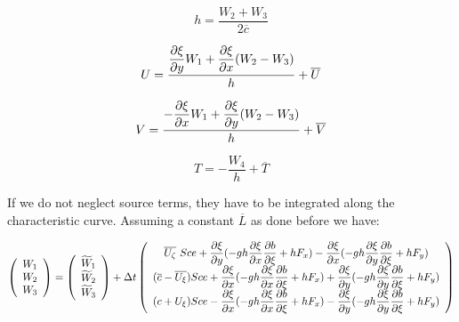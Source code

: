 \begin{equation}
h=\dfrac{W_{2}+W_{3}}{2\overline{c}}
\end{equation}

\begin{equation}
U=\dfrac{\dfrac{\partial \xi }{\partial y}W_{1}+\dfrac{\partial \xi }{%
\partial x}(W_{2}-W_{3})}{h}+\overline{U}
\end{equation}

\begin{equation}
V=\dfrac{-\dfrac{\partial \xi }{\partial x}W_{1}+\dfrac{\partial \xi }{%
\partial y}(W_{2}-W_{3})}{h}+\overline{V}
\end{equation}

\begin{equation}
T=-\dfrac{W_{4}}{h}+\overline{T}
\end{equation}

If we do not neglect source terms, they have to be integrated along the
characteristic curve. Assuming a constant $\overline{L}$ as done before we
have:

\begin{equation}
\left( 
\begin{array}{c}
W_{1} \\ 
W_{2} \\ 
W_{3}%
\end{array}
\right) =\left( 
\begin{array}{c}
\widetilde{W}_{1} \\ 
\widetilde{W}_{2} \\ 
\widetilde{W}_{3}%
\end{array}
\right) +\Delta t\left( 
\begin{array}{c}
\overline{U_{\zeta }}~Sce+\dfrac{\partial \xi }{\partial y}(-gh\dfrac{%
\partial \xi }{\partial x}\dfrac{\partial b}{\partial \xi }+hF_{x})-%
\dfrac{\partial \xi }{\partial x}(-gh\dfrac{\partial \xi }{\partial y}\dfrac{%
\partial b}{\partial \xi }+hF_{y}) \\ 
(\overline{c}-\overline{U_{\xi }})Sce+\dfrac{\partial \xi }{\partial x}(-gh%
\dfrac{\partial \xi }{\partial x}\dfrac{\partial b}{\partial \xi }%
+hF_{x})+\dfrac{\partial \xi }{\partial y}(-gh\dfrac{\partial \xi }{\partial
y}\dfrac{\partial b}{\partial \xi }+hF_{y}) \\ 
(c+U_{\xi })Sce-\dfrac{\partial \xi }{\partial x}(-gh\dfrac{\partial \xi }{%
\partial x}\dfrac{\partial b}{\partial \xi }+hF_{x})-\dfrac{\partial \xi 
}{\partial y}(-gh\dfrac{\partial \xi }{\partial y}\dfrac{\partial b}{%
\partial \xi }+hF_{y})%
\end{array}
\right)
\end{equation}


